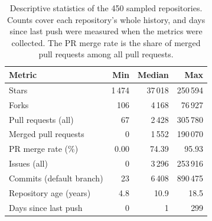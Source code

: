\begin{table}[t]
\centering
\caption{Descriptive statistics of the 450 sampled repositories. Counts cover each repository's whole history, and days since last push were measured when the metrics were collected. The PR merge rate is the share of merged pull requests among all pull requests.}
\label{tab:sample-overall}
\begin{tabular}{lrrr}
\toprule
\textbf{Metric} & \textbf{Min} & \textbf{Median} & \textbf{Max} \\
\midrule
Stars & 1\,474 & 37\,018 & 250\,594 \\
Forks & 106 & 4\,168 & 76\,927 \\
Pull requests (all) & 67 & 2\,428 & 305\,780 \\
Merged pull requests & 0 & 1\,552 & 190\,070 \\
PR merge rate (\%) & 0.00 & 74.39 & 95.93 \\
Issues (all) & 0 & 3\,296 & 253\,916 \\
Commits (default branch) & 23 & 6\,408 & 890\,475 \\
Repository age (years) & 4.8 & 10.9 & 18.5 \\
Days since last push & 0 & 1 & 299 \\
\bottomrule
\end{tabular}
\end{table}

